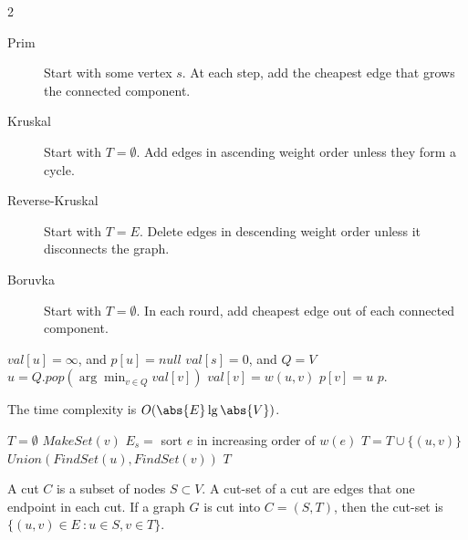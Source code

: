 \begin{multicols}{2}
\begin{description}
    \item[Prim] Start with some vertex $s$. At each step, add the cheapest edge that grows the connected component. 
    \item[Kruskal] Start with $T = \emptyset$. Add edges in ascending weight order unless they form a cycle. 
    \item[Reverse-Kruskal] Start with $T = E$. Delete edges in descending weight order unless it disconnects the graph. 
    \item[Boruvka] Start with $T = \emptyset$. In each rourd, add cheapest edge out of each connected component. 
\end{description}
\bigskip
\begin{algorithm}[H]
\caption{Prim$(V, E, w)$}
    \begin{algorithmic}[1]
            \State $val[u] = \infty$, and $p[u] = null$
            \State $val[s] = 0$, and $Q = V$
        \EndFor
            \State $u = Q.pop(\arg\min_{v \in Q} val[v])$
                    \State $val[v] = w(u,v)$
                    \State $p[v] = u$
                \EndIf
            \EndFor
        \EndWhile
        \State\Return $p$. 
    \end{algorithmic}
\end{algorithm}
The time complexity is $O(\abs{E} \lg \abs{V})$. 
\bigskip
\begin{algorithm}[H]
\caption{Kruskal}
\begin{algorithmic}[1]
    \State $T = \emptyset$
        \State $MakeSet(v)$
    \EndFor
    \State $E_{s} = $ sort $e$ in increasing order of $w(e)$
            \State $T = T\cup \{(u,v)\}$
            \State $Union(FindSet(u), FindSet(v))$
        \EndIf
    \EndFor
    \State\Return $T$
\end{algorithmic}
\end{algorithm}

\begin{definition}[Cut]
    A cut $C$ is a subset of nodes $S\subset V$. A cut-set of a cut are edges that one endpoint in each cut. If a graph $G$ is cut into $C = (S, T)$, then the cut-set is $\{(u,v) \in E\ : u \in S, v\in T\}$. 
\end{definition}


\end{multicols}

